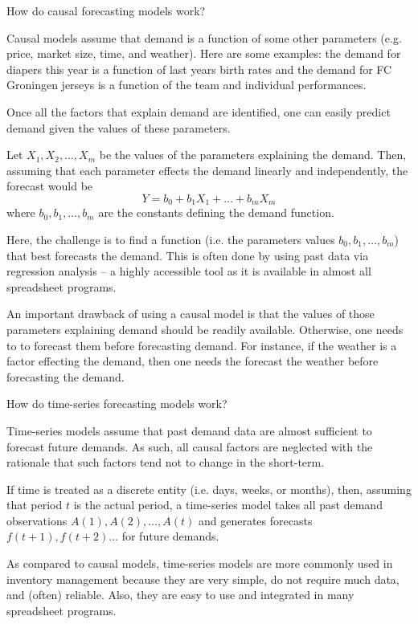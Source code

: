 \begin{question}
How do causal forecasting models work?

  \begin{solution}
    Causal models assume that demand is a function of some other parameters (e.g. price, market size, time, and weather). Here are some examples: the demand for diapers this year is a function of last years birth rates and the demand for FC Groningen jerseys is a function of the team and individual performances. 

Once all the factors that explain demand are identified, one can easily predict demand given the values of these parameters. 

Let $X_1,X_2,\ldots,X_m$ be the values of the parameters explaining the demand. Then, assuming that each parameter effects the demand linearly and independently, the forecast would be 
\begin{equation*}
Y = b_0 + b_1 X_1 + \ldots + b_m X_m
\end{equation*}
where $b_0,b_1,\ldots,b_m$ are the constants defining the demand function. 

Here, the challenge is to find a function (i.e. the parameters values $b_0,b_1,\ldots,b_m$) that best forecasts the demand. This is often done by using past data via regression analysis -- a highly accessible tool as it is available in almost all spreadsheet programs. 

An important drawback of using a causal model is that the values of those parameters explaining demand should be readily available. Otherwise, one needs to to forecast them before forecasting demand. For instance, if the weather is a factor effecting the demand, then one needs the forecast the weather before forecasting the demand.    

  \end{solution}
\end{question}


\begin{question}
How do time-series forecasting models work?

  \begin{solution}
Time-series models assume that past demand data are almost sufficient to forecast future demands. As such, all causal factors are neglected with the rationale that such factors tend not to change in the short-term. 

If time is treated as a discrete entity (i.e. days, weeks, or months), then, assuming that period $t$ is the actual period, a time-series model takes all past demand observations $A(1),A(2),\ldots,A(t)$ and generates forecasts $f(t+1),f(t+2)\ldots$ for future demands. 

As compared to causal models, time-series models are more commonly used in inventory management because they are very simple, do not require much data, and (often) reliable. Also, they are easy to use and integrated in many spreadsheet programs.
  \end{solution}
\end{question}


